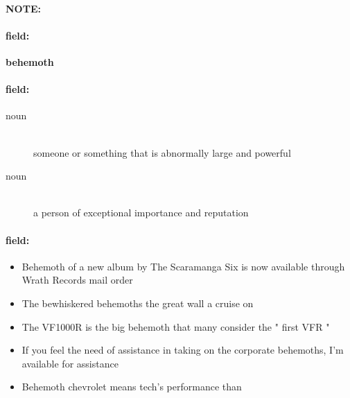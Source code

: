 \documentclass[12pt]{article}
\newenvironment{note}{\paragraph{NOTE:}}{}
\newenvironment{field}{\paragraph{field:}}{}
\begin{document}
\begin{note}
\begin{field}
\textbf{\large behemoth}
\end{field}


\begin{field}
\begin{description}
\item[noun] \hfill \\ 
someone or something that is abnormally large and powerful

\item[noun] \hfill \\ 
a person of exceptional importance and reputation

\end{description}
\end{field}

\begin{field}
\begin{itemize}
\item Behemoth of a new album by The Scaramanga Six is now available through Wrath Records mail order
\item The bewhiskered behemoths the great wall a cruise on
\item The VF1000R is the big behemoth that many consider the " first VFR " 
\item If you feel the need of assistance in taking on the corporate behemoths, I'm available for assistance
\item Behemoth chevrolet means tech's performance than
\end{itemize}
\end{field}
\end{note}
\end{document}
